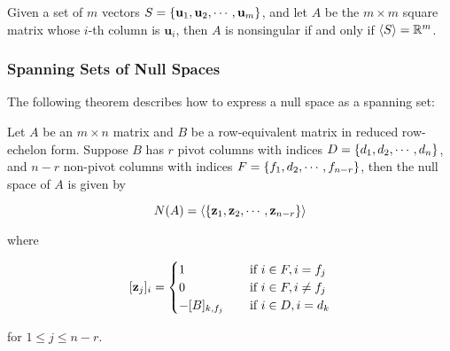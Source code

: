 \documentclass[a4paper,12pt]{article}
\begin{document}
\begin{thm}
  Given a set of $m$ vectors $S=\left\{ \mathbf{u}_{1},\mathbf{u}_{2},\cdots,\mathbf{u}_{m}\right\}$, and let $A$ be the $m\times m$ square matrix whose $i$-th column is $\mathbf{u}_{i}$, then $A$ is nonsingular if and only if $\left\langle S\right\rangle=\mathbb{R}^{m}$.
\end{thm}

\subsubsection{Spanning Sets of Null Spaces}
The following theorem describes how to express a null space as a spanning set:\n

\begin{thm}
  Let $A$ be an $m\times n$ matrix and $B$ be a row-equivalent matrix in reduced row-echelon form. Suppose $B$ has $r$ pivot columns with indices $D=\left\{ d_{1},d_{2},\cdots,d_{n}\right\}$, and $n-r$ non-pivot columns with indices $F=\left\{ f_{1},d_{2},\cdots,f_{n-r}\right\}$, then the null space of $A$ is given by

  $$N(A)=\left\langle \left\{ \mathbf{z}_{1},\mathbf{z}_{2},\cdots,\mathbf{z}_{n-r}\right\}\right\rangle$$\s

  where

  $$[\mathbf{z}_{j}]_{i}=\begin{cases}
    1&\;\;\;\;\text{if }i\in F,i=f_{j}\\
    0&\;\;\;\;\text{if }i\in F,i\neq f_{j}\\
    -[B]_{k,f_{j}}&\;\;\;\;\text{if }i\in D,i=d_{k}
  \end{cases}$$\s

  for $1\leq j\leq n-r$.
\end{thm}\n
\end{document}
